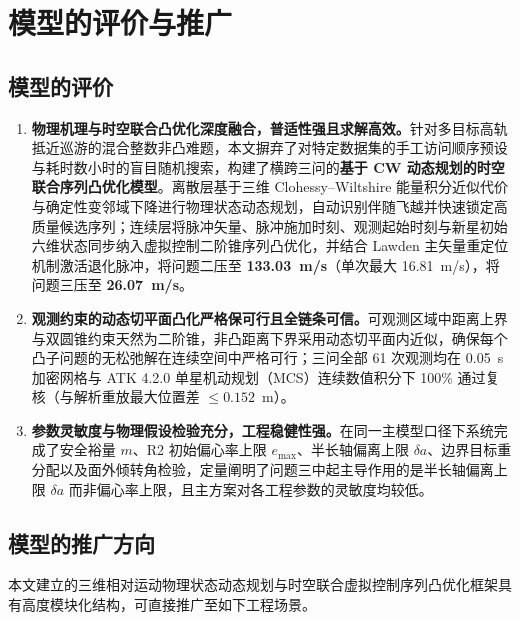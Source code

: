 \section{模型的评价与推广}

\subsection{模型的评价}

\begin{enumerate}
  \item \textbf{物理机理与时空联合凸优化深度融合，普适性强且求解高效。}针对多目标高轨抵近巡游的混合整数非凸难题，本文摒弃了对特定数据集的手工访问顺序预设与耗时数小时的盲目随机搜索，构建了横跨三问的\textbf{基于 CW 动态规划的时空联合序列凸优化模型}。离散层基于三维 Clohessy--Wiltshire 能量积分近似代价与确定性变邻域下降进行物理状态动态规划，自动识别伴随飞越并快速锁定高质量候选序列；连续层将脉冲矢量、脉冲施加时刻、观测起始时刻与新星初始六维状态同步纳入虚拟控制二阶锥序列凸优化，并结合 Lawden 主矢量\cite{lawden1963}重定位机制激活退化脉冲，将问题二压至 \textbf{133.03~m/s}（单次最大 16.81~m/s），将问题三压至 \textbf{26.07~m/s}。
  \item \textbf{观测约束的动态切平面凸化严格保可行且全链条可信。}可观测区域中距离上界与双圆锥约束天然为二阶锥，非凸距离下界采用动态切平面内近似，确保每个凸子问题的无松弛解在连续空间中严格可行；三问全部 61 次观测均在 0.05~s 加密网格与 ATK 4.2.0 单星机动规划（MCS）连续数值积分下 100\% 通过复核（与解析重放最大位置差 $\le 0.152$~m）。
  \item \textbf{参数灵敏度与物理假设检验充分，工程稳健性强。}在同一主模型口径下系统完成了安全裕量 $m$、R2 初始偏心率上限 $e_{\max}$、半长轴偏离上限 $\delta a$、边界目标重分配以及面外倾转角检验，定量阐明了问题三中起主导作用的是半长轴偏离上限 $\delta a$ 而非偏心率上限，且主方案对各工程参数的灵敏度均较低。
\end{enumerate}

\subsection{模型的推广方向}

本文建立的三维相对运动物理状态动态规划与时空联合虚拟控制序列凸优化框架具有高度模块化结构，可直接推广至如下工程场景。

